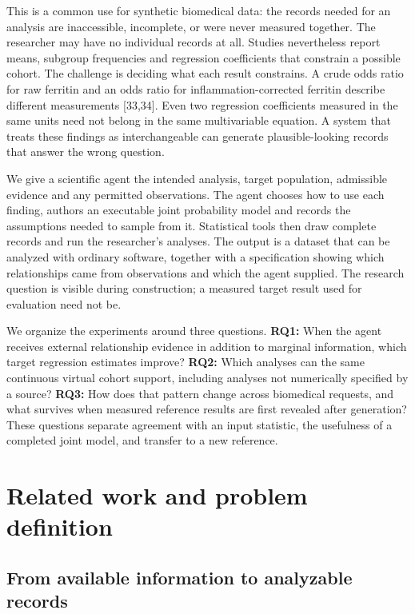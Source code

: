 \documentclass[sigconf,review]{acmart}
\begin{document}
This is a common use for synthetic biomedical data: the records needed for an analysis are inaccessible, incomplete, or were never measured together. The researcher may have no individual records at all. Studies nevertheless report means, subgroup frequencies and regression coefficients that constrain a possible cohort. The challenge is deciding what each result constrains. A crude odds ratio for raw ferritin and an odds ratio for inflammation-corrected ferritin describe different measurements [33,34]. Even two regression coefficients measured in the same units need not belong in the same multivariable equation. A system that treats these findings as interchangeable can generate plausible-looking records that answer the wrong question.


We give a scientific agent the intended analysis, target population, admissible evidence and any permitted observations. The agent chooses how to use each finding, authors an executable joint probability model and records the assumptions needed to sample from it. Statistical tools then draw complete records and run the researcher's analyses. The output is a dataset that can be analyzed with ordinary software, together with a specification showing which relationships came from observations and which the agent supplied. The research question is visible during construction; a measured target result used for evaluation need not be.


We organize the experiments around three questions. \textbf{RQ1:} When the agent receives external relationship evidence in addition to marginal information, which target regression estimates improve? \textbf{RQ2:} Which analyses can the same continuous virtual cohort support, including analyses not numerically specified by a source? \textbf{RQ3:} How does that pattern change across biomedical requests, and what survives when measured reference results are first revealed after generation? These questions separate agreement with an input statistic, the usefulness of a completed joint model, and transfer to a new reference.


\section{Related work and problem definition}

\subsection{From available information to analyzable records}
\end{document}
